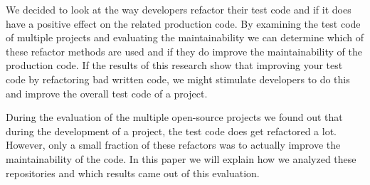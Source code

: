 We decided to look at the way developers refactor their test code and if it does have a positive effect on the related production code. By examining the test code of multiple projects and evaluating the maintainability we can determine which of these refactor methods are used and if they do improve the maintainability of the production code. If the results of this research show that improving your test code by refactoring bad written code, we might stimulate developers to do this and improve the overall test code of a project.

During the evaluation of the multiple open-source projects we found out that during the development of a project, the test code does get refactored a lot. However, only a small fraction of these refactors was to actually improve the maintainability of the code. In this paper we will explain how we analyzed these repositories and which results came out of this evaluation.
